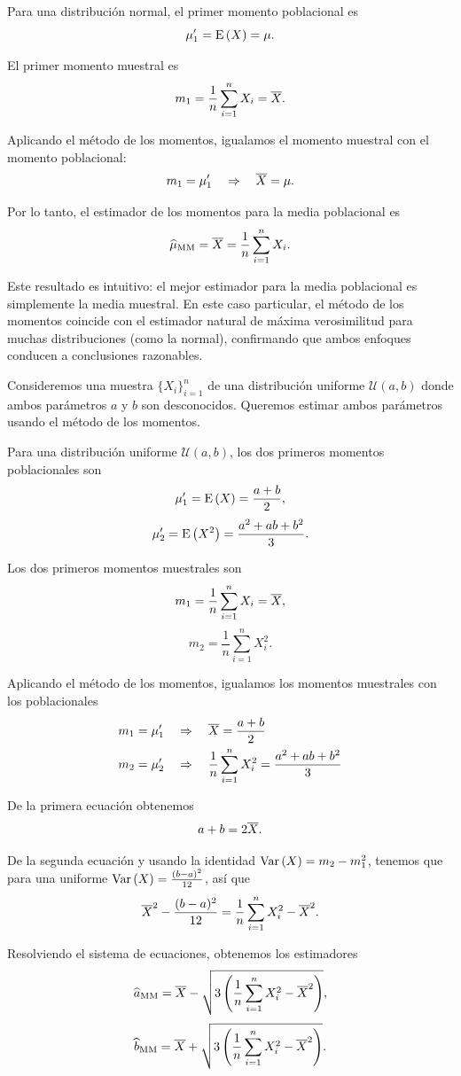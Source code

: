 Para una distribución normal, el primer momento poblacional es
\[\mu'_1 = \operatorname{E}\left(X\right) = \mu.\]

El primer momento muestral es
\[m_1 = \frac{1}{n}\sum_{i=1}^{n}X_i = \overline{X}.\]

Aplicando el método de los momentos, igualamos el momento muestral con el momento poblacional:
\[m_1 = \mu'_1 \quad \Rightarrow \quad \overline{X} = \mu.\]

Por lo tanto, el estimador de los momentos para la media poblacional es
\[\widehat{\mu}_{\text{MM}} = \overline{X} = \frac{1}{n}\sum_{i=1}^{n}X_i.\]

Este resultado es intuitivo: el mejor estimador para la media poblacional es simplemente la media muestral. En este caso particular, el método de los momentos coincide con el estimador natural de máxima verosimilitud para muchas distribuciones (como la normal), confirmando que ambos enfoques conducen a conclusiones razonables.

\example

Consideremos una muestra \(\{X_i\}_{i=1}^n\) de una distribución uniforme \(\mathcal{U}(a, b)\) donde ambos parámetros \(a\) y \(b\) son desconocidos. Queremos estimar ambos parámetros usando el método de los momentos.

Para una distribución uniforme \(\mathcal{U}(a, b)\), los dos primeros momentos poblacionales son
\[\mu'_1 = \operatorname{E}\left(X\right) = \frac{a+b}{2},\]
\[\mu'_2 = \operatorname{E}\left(X^2\right) = \frac{a^2 + ab + b^2}{3}.\]

Los dos primeros momentos muestrales son
\[m_1 = \frac{1}{n}\sum_{i=1}^{n}X_i = \overline{X},\]
\[m_2 = \frac{1}{n}\sum_{i=1}^{n}X_i^2.\]

Aplicando el método de los momentos, igualamos los momentos muestrales con los poblacionales
\begin{align*}
m_1 &= \mu'_1 \quad \Rightarrow \quad \overline{X} = \frac{a+b}{2}\\
m_2 &= \mu'_2 \quad \Rightarrow \quad \frac{1}{n}\sum_{i=1}^{n}X_i^2 = \frac{a^2 + ab + b^2}{3}
\end{align*}

De la primera ecuación obtenemos
\[a + b = 2\overline{X}.\]

De la segunda ecuación y usando la identidad \(\operatorname{Var}\left(X\right) =\nobreak m_2 -\nobreak m_1^2\), tenemos que para una uniforme \(\operatorname{Var}\left(X\right) = \frac{(b-a)^2}{12}\), así que
\[\overline{X}^2 - \frac{(b-a)^2}{12} = \frac{1}{n}\sum_{i=1}^{n}X_i^2 - \overline{X}^2.\]

Resolviendo el sistema de ecuaciones, obtenemos los estimadores
\[\widehat{a}_{\text{MM}} = \overline{X} - \sqrt{3\left(\frac{1}{n}\sum_{i=1}^{n}X_i^2 - \overline{X}^2\right)},\]
\[\widehat{b}_{\text{MM}} = \overline{X} + \sqrt{3\left(\frac{1}{n}\sum_{i=1}^{n}X_i^2 - \overline{X}^2\right)}.\]



